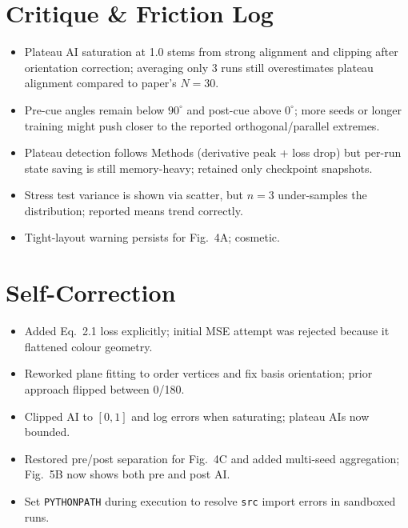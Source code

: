 \documentclass{article}
\begin{document}
\section{Critique \& Friction Log}
\begin{itemize}[leftmargin=*]
    \item Plateau AI saturation at 1.0 stems from strong alignment and clipping after orientation correction; averaging only 3 runs still overestimates plateau alignment compared to paper’s $N=30$.
    \item Pre-cue angles remain below $90^\circ$ and post-cue above $0^\circ$; more seeds or longer training might push closer to the reported orthogonal/parallel extremes.
    \item Plateau detection follows Methods (derivative peak + loss drop) but per-run state saving is still memory-heavy; retained only checkpoint snapshots.
    \item Stress test variance is shown via scatter, but $n=3$ under-samples the distribution; reported means trend correctly.
    \item Tight-layout warning persists for Fig.~4A; cosmetic.
\end{itemize}

\section{Self-Correction}
\begin{itemize}[leftmargin=*]
    \item Added Eq.~2.1 loss explicitly; initial MSE attempt was rejected because it flattened colour geometry.
    \item Reworked plane fitting to order vertices and fix basis orientation; prior approach flipped between 0/180.
    \item Clipped AI to $[0,1]$ and log errors when saturating; plateau AIs now bounded.
    \item Restored pre/post separation for Fig.~4C and added multi-seed aggregation; Fig.~5B now shows both pre and post AI.
    \item Set \texttt{PYTHONPATH} during execution to resolve \texttt{src} import errors in sandboxed runs.
\end{itemize}
\end{document}
